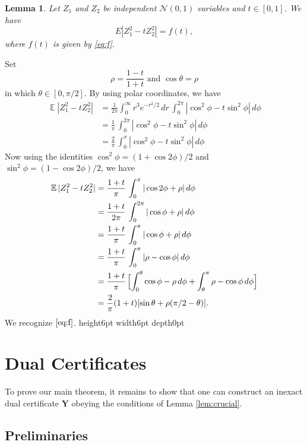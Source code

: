 \documentclass[11pt]{article}
\newtheorem{lemma}[theorem]{Lemma}
\newcommand{\<}{\langle}
\renewcommand{\>}{\rangle}
\newcommand{\E}{\operatorname{\mathbb{E}}}
\newcommand{\bY}{\bm{Y}}
\numberwithin{equation}{section}
\def \endprf{\hfill {\vrule height6pt width6pt depth0pt}\medskip}
\newenvironment{proof}{\noindent {\bf Proof} }{\endprf\par}
\begin{document}
\begin{lemma}
  Let $Z_1$ and $Z_2$ be independent $\mathcal{N}(0,1)$ variables and
  $t \in [0,1]$. We have
\[
E |Z_1^2 - t Z_2^2| = f(t), 
\] 
where $f(t)$ is given by \eqref{eq:f}.
\end{lemma}
\begin{proof}
  Set
\[
\rho = \frac{1-t}{1+t} \text{ and } \cos
\theta = \rho
\]
in which $\theta \in [0, \pi/2]$.  By using polar coordinates, we have
\begin{align*}
  \E |Z_1^2 - t Z_2^2| & = \frac{1}{2\pi} \int_0^\infty r^3 e^{-r^2/2} \, dr \, \int_0^{2\pi} | \cos^2 \phi - t \sin^2\phi| \, d\phi\\
& =   \frac{1}{\pi} \, \int_0^{2\pi} | \cos^2 \phi - t \sin^2\phi| \, d\phi\\
&  =   \frac{2}{\pi} \, \int_0^{\pi} | \cos^2 \phi - t \sin^2\phi| \, d\phi
\end{align*}
Now using the identities $\cos^2 \phi = (1+\cos 2\phi)/2$ and
$\sin^2\phi = (1-\cos 2\phi)/2$, we have
\begin{align*}
  \E |Z_1^2 - t Z_2^2| & = \frac{1+t}{\pi} \, \int_0^\pi |\cos 2\phi +
  \rho| \, d\phi\\
  & = \frac{1+t}{2\pi} \, \int_0^{2\pi} |\cos \phi +
  \rho| \, d\phi\\
  & = \frac{1+t}{\pi} \, \int_0^{\pi} |\cos \phi +
  \rho| \, d\phi\\
  & = \frac{1+t}{\pi} \, \int_0^{\pi} |\rho - \cos \phi|
  \, d\phi\\
  & = \frac{1+t}{\pi} \,\Bigl[ \int_0^\theta \cos \phi - \rho \, d\phi
  + \int_\theta^\pi \rho - \cos \phi \, d\phi \Bigr]\\
  & = \frac{2}{\pi} (1+t) [\sin \theta + \rho (\pi/2 - \theta)].
\end{align*}
We recognize $\eqref{eq:f}$. 
\end{proof}


\section{Dual Certificates} 
\label{sec:dual}

To prove our main theorem, it remains to show that one can construct
an inexact dual certificate $\bY$ obeying the conditions of Lemma
\ref{lem:crucial}.

\subsection{Preliminaries}
\end{document}
